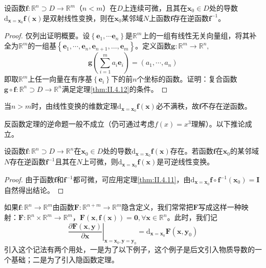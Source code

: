 \documentclass[main.tex]{subfiles}
\begin{document}
\begin{corollary}
    设函数$\mathbf{f}:\mathbb{R}^n\supset D\rightarrow\mathbb{R}^m$（$n<m$）在$D$上连续可微，且其在$\mathbf{x}_0\in D$处的导数$\mathrm{d}_{\mathbf{x}=\mathbf{x}_0}\mathbf{f}\left(\mathbf{x}\right)$是双射线性变换，则在$\mathbf{x}_0$某邻域$N$上函数$\mathbf{f}$存在逆函数$\mathbf{f}^{-1}$。
\end{corollary}
\begin{proof}
    仅列出证明概要。设$\left\{\mathbf{e}_1,\cdots\mathbf{e}_n\right\}$是$\mathbb{R}^m$上的一组有线性无关向量组，将其补全为$\mathbb{R}^m$的一组基$\left\{\mathbf{e}_1,\cdots,\mathbf{e}_n,\mathbf{e}_{n+1},\dots,\mathbf{e}_m\right\}$。定义函数$\mathbf{g}:\mathbb{R}^m\rightarrow\mathbb{R}^n,$
    \[\mathbf{g}\left(\sum_{i=1}^m a_i\mathbf{e}_i\right)=\left(a_1,\cdots,a_n\right)\]
    即取$\mathbb{R}^m$上任一向量在有序基$\left\{\mathbf{e}_i\right\}$下的前$n$个坐标的函数。证明：复合函数$\mathbf{g}\circ\mathbf{f}:\mathbb{R}^n\supset D\rightarrow\mathbb{R}^n$满足定理\ref{thm:II.4.12}的条件。

\end{proof}

当$n>m$时，由线性变换的维数定理$\mathrm{d}_{\mathbf{x}=\mathbf{x}_0}\mathbf{f}\left(\mathbf{x}\right)$必不满秩，故$\mathbf{f}$不存在逆函数。

反函数定理的逆命题一般不成立（仍可通过考虑$f\left(x\right)=x^3$理解）。以下推论成立。

\begin{corollary}
    设函数$\mathbf{f}:\mathbb{R}^n\supset D\rightarrow\mathbb{R}^n$在$\mathbf{x}_0\in D$处的导数$\mathrm{d}_{\mathbf{x}=\mathbf{x}_0}\mathbf{f}\left(\mathbf{x}\right)$存在。若函数$\mathbf{f}$在$\mathbf{x}_0$的某邻域$N$存在逆函数$\mathbf{f}^{-1}$且其在$N$上可微，则$\mathrm{d}_{\mathbf{x}=\mathbf{x}_0}\mathbf{f}\left(\mathbf{x}\right)$是可逆线性变换。
\end{corollary}
\begin{proof}
    由于函数$\mathbf{f}$和$\mathbf{f}^{-1}$都可微，可应用定理\ref{thm:II.4.11}，由$\mathrm{d}_{\mathbf{x}=\mathbf{x}_0}\mathbf{f}\circ\mathbf{f}^{-1}\left(\mathbf{x}_0\right)=\mathbf{I}$自然得出结论。
\end{proof}

如果$\mathbf{f}:\mathbb{R}^n\rightarrow\mathbb{R}^m$由函数$\mathbf{F}:\mathbb{R}^{n+m}\rightarrow\mathbb{R}^m$隐含定义，我们常常把$\mathbf{F}$写成这样一种映射：$\mathbf{F}:\mathbb{R}^n\times\mathbb{R}^m\rightarrow\mathbb{R}^m$，$\mathbf{F}\left(\mathbf{x},\mathbf{f}\left(\mathbf{x}\right)\right)=\mathbf{0},\forall\mathbf{x}\in\mathbb{R}^n$。此时，我们记
\[\left.\frac{\partial \mathbf{F}\left(\mathbf{x},\mathbf{y}\right)}{\partial \mathbf{x}}\right|_{\mathbf{x}=\mathbf{x}_0,\mathbf{y}=\mathbf{y}_0}=
    \mathrm{d}_{\mathbf{x}=\mathbf{x}_0}\mathbf{F}\left(\mathbf{x},\mathbf{y}_0\right)\]
引入这个记法有两个用处，一是为了以下例子，这个例子是后文引入物质导数的一个基础；二是为了引入隐函数定理。
\end{document}
